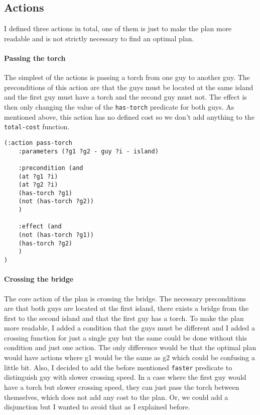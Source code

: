 \documentclass[a4paper,11pt]{article}
\begin{document}
\subsection*{Actions}
I defined three actions in total, one of them is just to make the plan more readable and is not strictly necessary to find an optimal plan.

\paragraph*{Passing the torch}
The simplest of the actions is passing a torch from one guy to another guy.
The preconditions of this action are that the guys must be located at the same island and the first guy must have a torch and the second guy must not.
The effect is then only changing the value of the \texttt{has-torch} predicate for both guys.
As mentioned above, this action has no defined cost so we don't add anything to the \texttt{total-cost} function.
\begin{verbatim}
(:action pass-torch
    :parameters (?g1 ?g2 - guy ?i - island)

    :precondition (and
    (at ?g1 ?i)
    (at ?g2 ?i)
    (has-torch ?g1)
    (not (has-torch ?g2))
    )

    :effect (and
    (not (has-torch ?g1))
    (has-torch ?g2)
    )
)
\end{verbatim}

\paragraph*{Crossing the bridge}
The core action of the plan is crossing the bridge.
The necessary preconditions are that both guys are located at the first island, there exists a bridge from the first to the second island and that the first guy has a torch.
To make the plan more readable, I added a condition that the guys must be different and I added a crossing function for just a single guy but the same could be done without this condition and just one action.
The only difference would be that the optimal plan would have actions where g1 would be the same as g2 which could be confusing a little bit.
Also, I decided to add the before mentioned \texttt{faster} predicate to distinguish guy with slower crossing speed.
In a case where the first guy would have a torch but slower crossing speed, they can just pass the torch between themselves, which does not add any cost to the plan.
Or, we could add a disjunction but I wanted to avoid that as I explained before.
\end{document}
